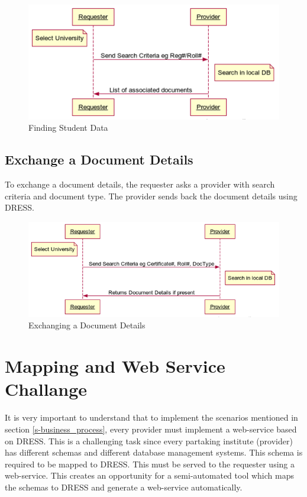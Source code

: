 \documentclass[12pt,a4paper,oneside]{book}
\begin{document}
\begin{figure}[!hbp]
  \centering
  \includegraphics[width=14cm]{sq_find_student_data.png}
  \caption{Finding Student Data}
  \label{fig:sq_find_student_data}
\end{figure}

    \subsection{Exchange a Document Details}
    To exchange a document details, the requester asks a provider with search criteria and document type. The provider sends back the document details using DRESS.

\begin{figure}[!htp]
  \centering
  \includegraphics[width=14cm]{sq_exchange_doc.png}
  \caption{Exchanging a Document Details}
  \label{fig:sq_exchange_doc}
\end{figure}

\section{Mapping and Web Service Challange}

It is very important to understand that to implement the scenarios mentioned in section \ref{s-business_process}, every provider must implement a web-service based on DRESS. This is a challenging task since every partaking institute (provider) has different schemas and different database management systems. This schema is required to be mapped to DRESS. This must be served to the requester using a web-service. This creates an opportunity for a semi-automated tool which maps the schemas to DRESS and generate a web-service automatically.
\end{document}
